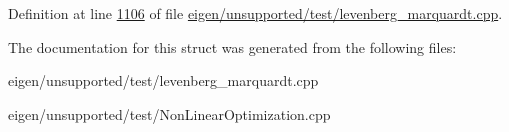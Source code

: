 Definition at line \hyperlink{eigen_2unsupported_2test_2levenberg__marquardt_8cpp_source_l01106}{1106} of file \hyperlink{eigen_2unsupported_2test_2levenberg__marquardt_8cpp_source}{eigen/unsupported/test/levenberg\+\_\+marquardt.\+cpp}.



The documentation for this struct was generated from the following files\+:\begin{DoxyCompactItemize}
\item 
eigen/unsupported/test/levenberg\+\_\+marquardt.\+cpp\item 
eigen/unsupported/test/\+Non\+Linear\+Optimization.\+cpp\end{DoxyCompactItemize}
